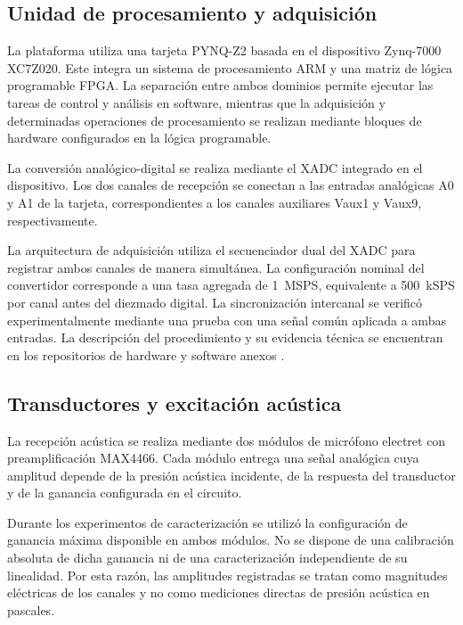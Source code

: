 \subsection{Unidad de procesamiento y adquisición}

La plataforma utiliza una tarjeta PYNQ-Z2 basada en el dispositivo
Zynq-7000 XC7Z020. Este integra un sistema de procesamiento
ARM y una matriz de lógica programable FPGA. La separación entre
ambos dominios permite ejecutar las tareas de control y análisis
en software, mientras que la adquisición y determinadas operaciones
de procesamiento se realizan mediante bloques de hardware
configurados en la lógica programable.

La conversión analógico-digital se realiza mediante el XADC
integrado en el dispositivo. Los dos canales de recepción se
conectan a las entradas analógicas A0 y A1 de la tarjeta,
correspondientes a los canales auxiliares Vaux1 y Vaux9,
respectivamente.

La arquitectura de adquisición utiliza el secuenciador dual del
XADC para registrar ambos canales de manera simultánea. La
configuración nominal del convertidor corresponde a una tasa
agregada de \SI{1}{MSPS}, equivalente a
\SI{500}{kSPS} por canal antes del diezmado digital. La
sincronización intercanal se verificó experimentalmente mediante
una prueba con una señal común aplicada a ambas entradas. La
descripción del procedimiento y su evidencia técnica se encuentran
en los repositorios de hardware y software anexos
\cite{SiririHW2026,SiririSW2026}.

\subsection{Transductores y excitación acústica}

La recepción acústica se realiza mediante dos módulos de micrófono
electret con preamplificación MAX4466. Cada módulo entrega una
señal analógica cuya amplitud depende de la presión acústica
incidente, de la respuesta del transductor y de la ganancia
configurada en el circuito.

Durante los experimentos de caracterización se utilizó la
configuración de ganancia máxima disponible en ambos módulos.
No se dispone de una calibración absoluta de dicha ganancia ni
de una caracterización independiente de su linealidad. Por esta
razón, las amplitudes registradas se tratan como magnitudes
eléctricas de los canales y no como mediciones directas de
presión acústica en pascales.

